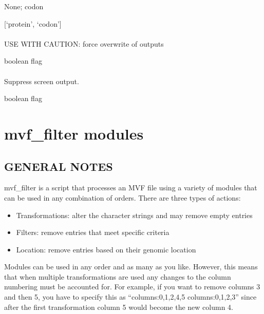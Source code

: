 \documentclass[letterpaper,11pt,english]{sphinxmanual}
\begin{document}
 None;  codon

 {[}‘protein’, ‘codon’{]}


\subsubsection{}
\label{\detokenize{prog_desc:id129}}
 USE WITH CAUTION: force overwrite of outputs

 boolean flag


\subsubsection{}
\label{\detokenize{prog_desc:id130}}
 Suppress screen output.

 boolean flag


\chapter{mvf\_filter modules}
\label{\detokenize{mvf_filter_modules:mvf-filter-modules}}\label{\detokenize{mvf_filter_modules::doc}}

\section{GENERAL NOTES}
\label{\detokenize{mvf_filter_modules:general-notes}}
mvf\_filter is a script that processes an MVF file using a variety
of modules that can be used in any combination of orders.  There
are three types of actions:
\begin{itemize}
\item {} 
Transformations: alter the character strings and may remove empty entries

\item {} 
Filters: remove entries that meet specific criteria

\item {} 
Location: remove entries based on their genomic location

\end{itemize}

Modules can be used in any order and as many as you like.  However,
this means that when multiple transformations are used any changes
to the column numbering must be accounted for.  For example,
if you want to remove columns 3 and then 5, you have to specify this as
“columns:0,1,2,4,5 columns:0,1,2,3” since after the first
transformation column 5 would become the new column 4.
\end{document}
